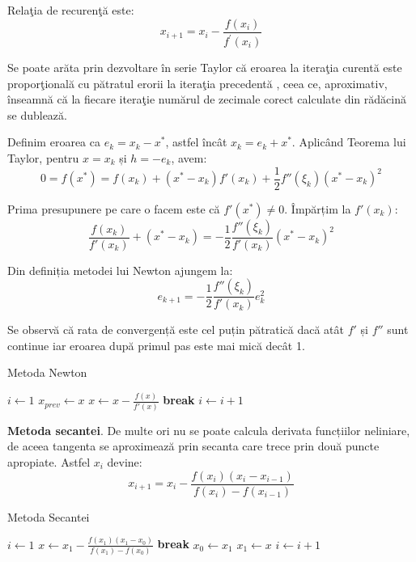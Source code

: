 \documentclass{exam}
\begin{document}
Relaţia de recurenţă este:
$$x_{i+1}=x_{i}-\frac{f(x_{i})}{f^{'}(x_{i})}$$

Se poate arăta prin dezvoltare în serie Taylor că eroarea la iteraţia curentă
este proporţională cu pătratul erorii la iteraţia precedentă \cite{Quad},
ceea ce, aproximativ, înseamnă că la fiecare iteraţie numărul de zecimale corect
calculate din rădăcină se dublează.

Definim eroarea ca $e_k = x_k - x^*$, astfel încât $x_k = e_k + x^*$. Aplicând
Teorema lui Taylor, pentru $x = x_k$ și $h = -e_k$, avem:
\begin{equation*}
	0 = f(x^*) = f(x_k) + (x^* - x_k) f'(x_k) + \frac{1}{2} f''(\xi_k) (x^* - x_k)^2
\end{equation*}

Prima presupunere pe care o facem este că $f'(x^*) \neq 0$. Împărțim la $f'(x_k)$:
\begin{equation*}
	\frac{f(x_k)}{f'(x_k)} + (x^* - x_k) = -\frac{1}{2} \frac{f''(\xi_k)}{f'(x_k)} (x^* - x_k)^2
\end{equation*}

Din definiția metodei lui Newton ajungem la:
\begin{equation*}
	e_{k+1} = - \frac{1}{2} \frac{f''(\xi_k)}{f'(x_k)} e_k^2
\end{equation*}

Se observă că rata de convergență este cel puțin pătratică dacă atât $f'$ și
$f''$ sunt continue iar eroarea după primul pas este mai mică decât 1.

\newpage
\begin{algorithm}
	\caption{Metoda Newton}
	\begin{algorithmic}[1]
		\State $i \gets 1$
		\State $x_{prev} \gets x$
		\State $x \gets x - \frac{f(x)}{f'(x)}$
		\State \textbf{break}
		\EndIf
		\State $i \gets i + 1$
		\EndWhile
	\end{algorithmic}
\end{algorithm}

\textbf{Metoda secantei}. De multe ori nu se poate calcula derivata funcțiilor
neliniare, de aceea tangenta se aproximează prin secanta care trece prin două
puncte apropiate. Astfel $x_i$ devine:
\begin{equation*}
	x_{i+1}=x_i - \frac{f(x_i)(x_i - x_{i - 1})}{f(x_i)-f(x_{i - 1})}
\end{equation*}

\begin{algorithm}
	\caption{Metoda Secantei}
	\begin{algorithmic}[1]
		\State $i \gets 1$
		\State $x \gets x_1 - \frac{f(x_1)(x_1 - x_0)}{f(x_1) - f(x_0)}$
		\State \textbf{break}
		\EndIf
		\State $x_0 \gets x_1$
		\State $x_1 \gets x$
		\State $i \gets i + 1$
		\EndWhile
	\end{algorithmic}
\end{algorithm}
\end{document}

